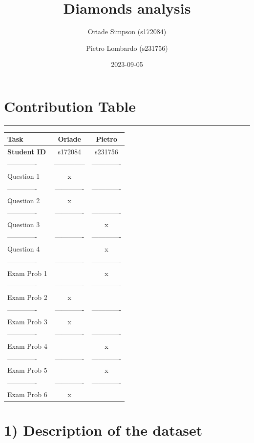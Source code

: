 \documentclass[
]{article}
\title{Diamonds analysis}
\author{Oriade Simpson (s172084) \and Pietro Lombardo (s231756)}
\date{2023-09-05}
\begin{document}
\maketitle

\section{Contribution Table}\label{contribution-table}

\begin{center}\rule{0.5\linewidth}{0.5pt}\end{center}

\begin{longtable}[]{@{}lcc@{}}
\toprule\noalign{}
Task & Oriade & Pietro \\
\midrule\noalign{}
\endhead
\bottomrule\noalign{}
\endlastfoot
\textbf{Student ID} & s172084 & s231756 \\
------------- & -------------- & ------------- \\
Question 1 & x & \\
------------- & ------------- & ------------- \\
Question 2 & x & \\
------------- & ------------- & ------------- \\
Question 3 & & x \\
------------- & ------------- & ------------- \\
Question 4 & & x \\
------------- & ------------- & ------------- \\
Exam Prob 1 & & x \\
------------- & ------------- & ------------- \\
Exam Prob 2 & x & \\
------------- & ------------- & ------------- \\
Exam Prob 3 & x & \\
------------- & ------------- & ------------- \\
Exam Prob 4 & & x \\
------------- & ------------- & ------------- \\
Exam Prob 5 & & x \\
------------- & ------------- & ------------- \\
Exam Prob 6 & x & \\
\end{longtable}

\section{1) Description of the
dataset}\label{description-of-the-dataset}
\end{document}
